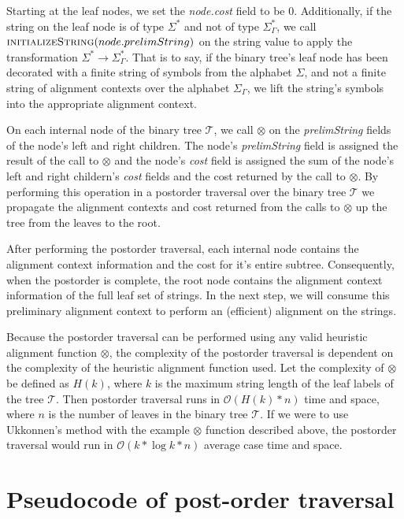 \documentclass[11pt]{article}
\begin{document}
Starting at the leaf nodes, we set the \textit{node.cost} field to be $0$.
Additionally, if the string on the leaf node is of type $\Sigma^{*}$ and not of type $\Sigma^{*}_{\Gamma}$, we call $\Call{initializeString}{node.prelimString}$ on the string value to apply the transformation $\Sigma^{*} \rightarrow \Sigma^{*}_{\Gamma}$.
That is to say, if the binary tree's leaf node has been decorated with a finite string of symbols from the alphabet $\Sigma$, and not a finite string of alignment contexts over the alphabet $\Sigma_{\Gamma}$, we lift the string's symbols into the appropriate alignment context. %

On each internal node of the binary tree $\mathcal{T}$, we call $\otimes$ on the \textit{prelimString} fields of the node's left and right children.
The node's \textit{prelimString} field is assigned the result of the call to $\otimes$ and the node's  \textit{cost} field is assigned the sum of the node's left and right childern's \textit{cost} fields and the cost returned by the call to $\otimes$.
By performing this operation in a postorder traversal over the binary tree $\mathcal{T}$ we propagate the alignment contexts and cost returned from the calls to $\otimes$ up the tree from the leaves to the root.

After performing the postorder traversal, each internal node contains the alignment context information and the cost for it's entire subtree.
Consequently, when the postorder is complete, the root node contains the alignment context information of the full leaf set of strings.
In the next step, we will consume this preliminary alignment context to perform an (efficient) alignment on the strings.

Because the postorder traversal can be performed using any valid heuristic alignment function $\otimes$, the complexity of the postorder traversal is dependent on the complexity of the heuristic alignment function used.
Let the complexity of $\otimes$ be defined as $H(k)$, where $k$ is the maximum string length of the leaf labels of the tree $\mathcal{T}$.
Then postorder traversal runs in $\mathcal{O}(H(k) * n)$ time and space, where $n$ is the number of leaves in the binary tree $\mathcal{T}$.
If we were to use Ukkonnen's method with the example $\otimes$ function described above, the postorder traversal would run in $\mathcal{O}(k * \log  k * n)$ average case time and space.

\section{Pseudocode of post-order traversal}
\end{document}
